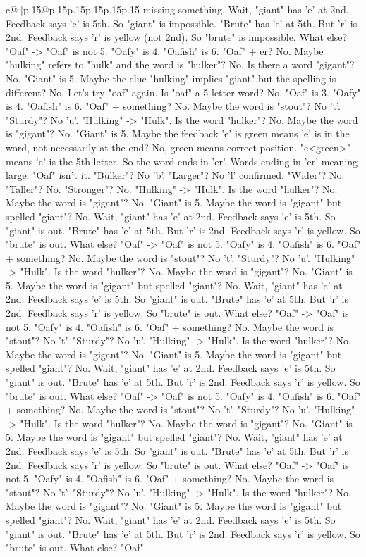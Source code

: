 \documentclass{article}
\begin{document}
{\begin{supertabular}{c@{$\;$}|p{.15\linewidth}@{}p{.15\linewidth}p{.15\linewidth}p{.15\linewidth}p{.15\linewidth}p{.15\linewidth}}
{{{missing something. Wait, "giant" has 'e' at 2nd. Feedback says 'e' is 5th. So "giant" is impossible. "Brute" has 'e' at 5th. But 'r' is 2nd. Feedback says 'r' is yellow (not 2nd). So "brute" is impossible. What else? "Oaf" {-}> "Oaf" is not 5. "Oafy" is 4. "Oafish" is 6. "Oaf" + er? No. Maybe "hulking" refers to "hulk" and the word is "hulker"? No. Is there a word "gigant"? No. "Giant" is 5. Maybe the clue "hulking" implies "giant" but the spelling is different? No. Let's try "oaf" again. Is "oaf" a 5 letter word? No. "Oaf" is 3. "Oafy" is 4. "Oafish" is 6. "Oaf" + something? No. Maybe the word is "stout"? No 't'. "Sturdy"? No 'u'. "Hulking" {-}> "Hulk". Is the word "hulker"? No. Maybe the word is "gigant"? No. "Giant" is 5. Maybe the feedback 'e' is green means 'e' is in the word, not necessarily at the end? No, green means correct position. "e<green>" means 'e' is the 5th letter. So the word ends in 'er'. Words ending in 'er' meaning large: "Oaf" isn't it. "Bulker"? No 'b'. "Larger"? No 'l' confirmed. "Wider"? No. "Taller"? No. "Stronger"? No. "Hulking" {-}> "Hulk". Is the word "hulker"? No. Maybe the word is "gigant"? No. "Giant" is 5. Maybe the word is "gigant" but spelled "giant"? No. Wait, "giant" has 'e' at 2nd. Feedback says 'e' is 5th. So "giant" is out. "Brute" has 'e' at 5th. But 'r' is 2nd. Feedback says 'r' is yellow. So "brute" is out. What else? "Oaf" {-}> "Oaf" is not 5. "Oafy" is 4. "Oafish" is 6. "Oaf" + something? No. Maybe the word is "stout"? No 't'. "Sturdy"? No 'u'. "Hulking" {-}> "Hulk". Is the word "hulker"? No. Maybe the word is "gigant"? No. "Giant" is 5. Maybe the word is "gigant" but spelled "giant"? No. Wait, "giant" has 'e' at 2nd. Feedback says 'e' is 5th. So "giant" is out. "Brute" has 'e' at 5th. But 'r' is 2nd. Feedback says 'r' is yellow. So "brute" is out. What else? "Oaf" {-}> "Oaf" is not 5. "Oafy" is 4. "Oafish" is 6. "Oaf" + something? No. Maybe the word is "stout"? No 't'. "Sturdy"? No 'u'. "Hulking" {-}> "Hulk". Is the word "hulker"? No. Maybe the word is "gigant"? No. "Giant" is 5. Maybe the word is "gigant" but spelled "giant"? No. Wait, "giant" has 'e' at 2nd. Feedback says 'e' is 5th. So "giant" is out. "Brute" has 'e' at 5th. But 'r' is 2nd. Feedback says 'r' is yellow. So "brute" is out. What else? "Oaf" {-}> "Oaf" is not 5. "Oafy" is 4. "Oafish" is 6. "Oaf" + something? No. Maybe the word is "stout"? No 't'. "Sturdy"? No 'u'. "Hulking" {-}> "Hulk". Is the word "hulker"? No. Maybe the word is "gigant"? No. "Giant" is 5. Maybe the word is "gigant" but spelled "giant"? No. Wait, "giant" has 'e' at 2nd. Feedback says 'e' is 5th. So "giant" is out. "Brute" has 'e' at 5th. But 'r' is 2nd. Feedback says 'r' is yellow. So "brute" is out. What else? "Oaf" {-}> "Oaf" is not 5. "Oafy" is 4. "Oafish" is 6. "Oaf" + something? No. Maybe the word is "stout"? No 't'. "Sturdy"? No 'u'. "Hulking" {-}> "Hulk". Is the word "hulker"? No. Maybe the word is "gigant"? No. "Giant" is 5. Maybe the word is "gigant" but spelled "giant"? No. Wait, "giant" has 'e' at 2nd. Feedback says 'e' is 5th. So "giant" is out. "Brute" has 'e' at 5th. But 'r' is 2nd. Feedback says 'r' is yellow. So "brute" is out. What else? "Oaf" }}}
\end{supertabular}}
\end{document}
